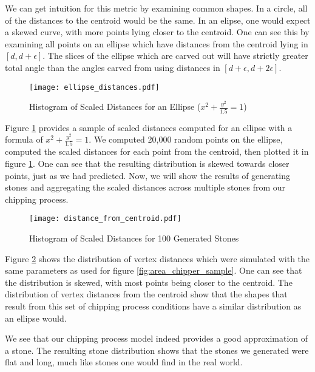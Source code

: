 We can get intuition for this metric by examining common shapes. In a circle, all of the distances to the centroid would be the same. In an elipse, one would expect a skewed curve, with more points lying closer to the centroid. One can see this by examining all points on an ellipse which have distances from the centroid lying in $[d, d + \epsilon]$. The slices of the ellipse which are carved out will have strictly greater total angle than the angles carved from using distances in $[d + \epsilon, d + 2 \epsilon]$.

\begin{figure}
  \begin{center}
    \texttt{[image: ellipse\_distances.pdf]}
  \end{center}
  \caption{Histogram of Scaled Distances for an Ellipse ($x^2 + \frac{y^2}{1.5} = 1$) \label{fig:ellipse_distances}}
\end{figure}

Figure \ref{fig:ellipse_distances} provides a sample of scaled distances computed for an ellipse with a formula of $x^2 + \frac{y^2}{1.5} = 1$. We computed 20,000 random points on the ellipse, computed the scaled distances for each point from the centroid, then plotted it in figure \ref{fig:ellipse_distances}. One can see that the resulting distribution is skewed towards closer points, just as we had predicted. Now, we will show the results of generating stones and aggregating the scaled distances across multiple stones from our chipping process.

\begin{figure}
  \begin{center}
    \texttt{[image: distance\_from\_centroid.pdf]}
  \end{center}
  \caption{Histogram of Scaled Distances for 100 Generated Stones \label{fig:distance_from_centroid}}
\end{figure}

Figure \ref{fig:distance_from_centroid} shows the distribution of vertex distances which were simulated with the same parameters as used for figure \ref{fig:area_chipper_sample}. One can see that the distribution is skewed, with most points being closer to the centroid. The distribution of vertex distances from the centroid show that the shapes that result from this set of chipping process conditions have a similar distribution as an ellipse would.

We see that our chipping process model indeed provides a good approximation of a stone. The resulting stone distribution shows that the stones we generated were flat and long, much like stones one would find in the real world.
